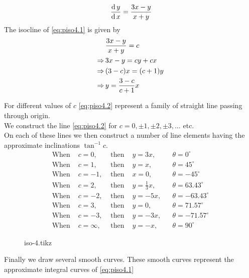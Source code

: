 \documentclass[../main-sheet.tex]{subfiles}
\begin{document}
\begin{soln}
    \begin{equation}
        \,\frac{\mathrm{d}\,y}{\mathrm{d}\,x}=\frac{3x-y}{x+y}\label{eq:piso4.1}
    \end{equation}
    The isocline of \eqref{eq:piso4.1} is given by 
    \begin{align}
        &\frac{3x-y}{x+y}=c\notag\\
        \Rightarrow\,&3x-y=cy+cx\notag\\
        \Rightarrow\,&(3-c)x=(c+1)y\notag\\
        \Rightarrow\,&y=\frac{3-c}{c+1}x\label{eq:piso4.2}
    \end{align}
    
    For different values of \(c\) \eqref{eq:piso4.2} represent a family of straight line passing through origin.\\
    We construct the line \eqref{eq:piso4.2} for \(c=0,\pm1,\pm2,\pm3,\dots\) etc.\\
    On each of these lines we then construct a number of line elements having the approximate inclinations \(\tan^{-1}c\).\\
    \begin{align*}
        \text{When } & c=0,  & \text{ then } & y=3x,   &&\theta=0^{\circ}\\
        \text{When } & c=1,  & \text{ then } & y=x, &&\theta=45^{\circ}\\
        \text{When } & c=-1, & \text{ then } & x=0, &&\theta=-45^{\circ}\\
        \text{When } & c=2,  & \text{ then } & y=\frac{1}{3}x, &&\theta=63.43^{\circ}\\
        \text{When } & c=-2, & \text{ then } & y=-5x, &&\theta=-63.43^{\circ}\\
        \text{When } & c=3, & \text{ then } & y=0, &&\theta=71.57^{\circ}\\
        \text{When } & c=-3, & \text{ then } & y=-3x, &&\theta=-71.57^{\circ}\\
        \text{When } & c=\infty, & \text{ then } & y=-x, &&\theta=90^{\circ}
    \end{align*}
    \begin{figure}[H]
        \centering
        {iso-4.tikz}
    \end{figure}
    Finally we draw several smooth curves. These smooth curves represent the approximate integral curves of \eqref{eq:piso4.1}
\end{soln}
\end{document}
